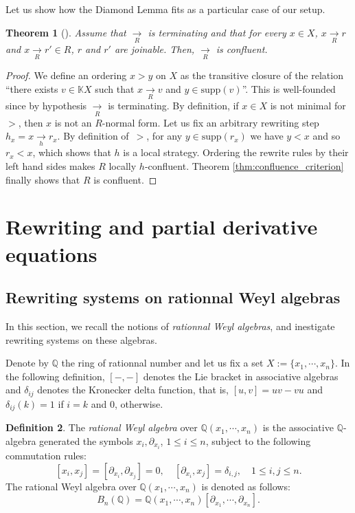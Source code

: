 \documentclass[10pt]{easychair}
\newtheorem{theorem}{Theorem}[section]
\theoremstyle{definition}
\newtheorem{definition}[theorem]{Definition}
\newcommand\K{\mathbb{K}}
\newcommand\Q{\mathbb{Q}}
\newcommand\QX{\mathbb{Q}(x_1,\cdots,x_n)}
\newcommand\KX{\K X}
\newcommand\supp{\text{supp}}
\newcommand\rewR{\underset{R}{\longrightarrow}}
\newcommand\rewh{\underset{h}{\longrightarrow}}
\newcommand\diff[1]{\partial_{x_{#1}}}
\begin{document}
\medskip


Let us show how the Diamond Lemma fits as a particular case of our setup.
\smallskip

\begin{theorem}[\cite{MR506890}]\label{thm:diamond_lemma}
  Assume that $\rewR$ is terminating and that for every $x\in X$, $x\rewR r$ and $x\rewR r'\in R$, $r$ and $r'$ are joinable. Then, $\rewR$ is confluent.
\end{theorem}

\begin{proof}
  We define an ordering $x > y$ on $X$ as the transitive closure of the relation ``there exists $v \in \KX$ such that $x \rewR v$ and $y\in\supp(v)$''. This is well-founded since by hypothesis $\rewR$ is terminating. By definition, if $x \in X$ is not minimal for $>$, then $x$ is not an $R$-normal form. Let us fix an arbitrary rewriting step $h_x= x \rewh r_x$.  By definition of~$>$, for any $y \in \supp(r_x)$ we have $y < x$ and so $r_x < x$, which shows that  $h$ is a local strategy. Ordering the rewrite rules by their left hand sides makes $R$ locally $h$-confluent. Theorem \ref{thm:confluence_criterion} finally shows that $R$ is confluent.  
\end{proof}


\section{Rewriting and partial derivative equations}

\subsection{Rewriting systems on rationnal Weyl algebras}

In this section, we recall the notions of {\em rationnal Weyl algebras},
and inestigate rewriting systems on these algebras.
\medskip

Denote by $\Q$ the ring of rationnal number and let us fix a set
$X:=\{x_1,\cdots,x_n\}$. In the following definition, $[-,-]$ denotes the
Lie bracket in associative algebras and $\delta_{ij}$ denotes the
Kronecker delta function, that is, $[u,v]=uv-vu$ and $\delta_{ij}(k)=1$
if $i=k$ and $0$, otherwise.

\begin{definition}
  The {\em rational Weyl algebra} over $\QX$ is the associative
  $\Q$-algebra generated the symbols $x_i,\diff{i}$, $1\leq i\leq n$,
  subject to the following commutation rules: 
  \[[x_i,x_j]=[\diff{i},\diff{j}]=0,\quad [\diff{i},x_j]=\delta_{i,j},
  \quad 1\leq i,j\leq n.\]
  The rational Weyl algebra over $\QX$ is denoted as follows:
  \[B_n(\Q)=\QX[\diff{1},\cdots,\diff{n}].\]
\end{definition}
\end{document}
